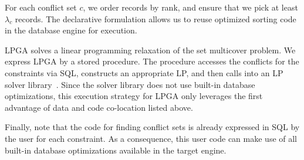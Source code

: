 For each conflict set $c$, we order records by rank, and ensure that we pick at least $\lambda_c$ records. The declarative formulation allows us to reuse optimized sorting code in the database engine for execution.

LPGA solves a linear programming relaxation of the set multicover problem. We express LPGA by a stored procedure. The procedure accesses the conflicts for the constraints via SQL, constructs an appropriate LP, and then calls into an LP solver library~\cite{cvxopt}. Since the solver library does not use built-in database optimizations, this execution strategy for LPGA only leverages the first advantage of data and code co-location listed above.

Finally, note that the code for finding conflict sets is already expressed in SQL by the user for each constraint. As a consequence, this user code can make use of all built-in database optimizations available in the target engine.





